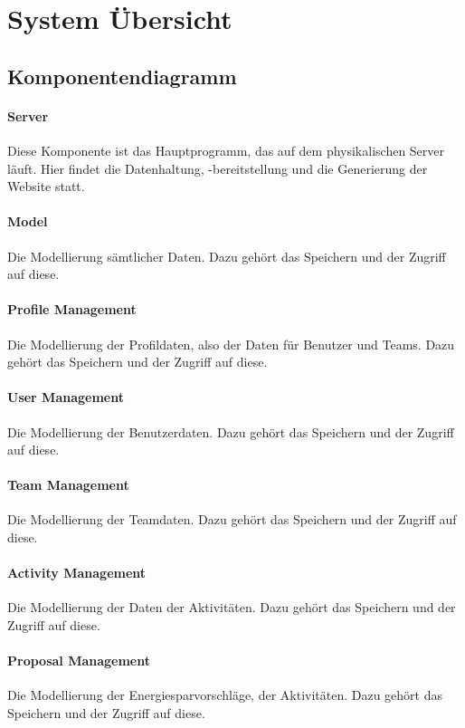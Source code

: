 \section{System \"Ubersicht}

\subsection{Komponentendiagramm}

\paragraph{Server} Diese Komponente ist das Hauptprogramm, das auf dem physikalischen Server läuft. Hier findet die Datenhaltung, -bereitstellung und die Generierung der Website statt.

\paragraph{Model} Die Modellierung sämtlicher Daten. Dazu gehört das Speichern und der Zugriff auf diese.

\paragraph{Profile Management} Die Modellierung der Profildaten, also der Daten für Benutzer und Teams. Dazu gehört das Speichern und der Zugriff auf diese.

\paragraph{User Management} Die Modellierung der Benutzerdaten. Dazu gehört das Speichern und der Zugriff auf diese.

\paragraph{Team Management} Die Modellierung der Teamdaten. Dazu gehört das Speichern und der Zugriff auf diese.

\paragraph{Activity Management} Die Modellierung der Daten der Aktivitäten. Dazu gehört das Speichern und der Zugriff auf diese.

\paragraph{Proposal Management}  Die Modellierung der Energiesparvorschläge, der Aktivitäten. Dazu gehört das Speichern und der Zugriff auf diese.

